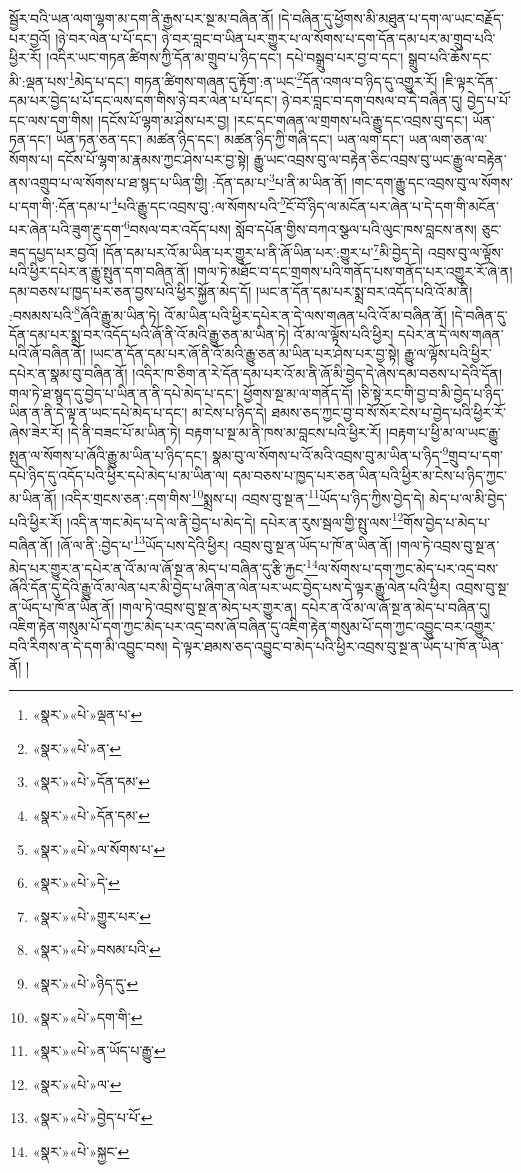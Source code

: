 སྦྱོར་བའི་ཡན་ལག་ལྷག་མ་དག་ནི་རྒྱས་པར་སྔ་མ་བཞིན་ནོ། །དེ་བཞིན་དུ་ཕྱོགས་མི་མཐུན་པ་དག་ལ་ཡང་བརྗོད་པར་བྱའོ། །ཉེ་བར་ལེན་པ་པོ་དང་། ཉེ་བར་བླང་བ་ཡིན་པར་གྱུར་པ་ལ་སོགས་པ་དག་དོན་དམ་པར་མ་གྲུབ་པའི་ཕྱིར་རོ། །འདིར་ཡང་གཏན་ཚིགས་ཀྱི་དོན་མ་གྲུབ་པ་ཉིད་དང་། དཔེ་བསྒྲུབ་པར་བྱ་བ་དང་། སྒྲུབ་པའི་ཆོས་དང་མི་:ལྡན་པས་\footnote{«སྣར་»«པེ་»ལྡན་པ་}མེད་པ་དང་། གཏན་ཚིགས་གཞན་དུ་རྟོག་:ན་ཡང་\footnote{«སྣར་»«པེ་»ན་}དོན་འགལ་བ་ཉིད་དུ་འགྱུར་རོ། །ཇི་ལྟར་དོན་དམ་པར་བྱེད་པ་པོ་དང་ལས་དག་གིས་ཉེ་བར་ལེན་པ་པོ་དང་། ཉེ་བར་བླང་བ་དག་བསལ་བ་དེ་བཞིན་དུ། བྱེད་པ་པོ་དང་ལས་དག་གིས། །དངོས་པོ་ལྷག་མ་ཤེས་པར་བྱ། །རང་དང་གཞན་ལ་གྲགས་པའི་རྒྱུ་དང་འབྲས་བུ་དང་། ཡོན་ཏན་དང་། ཡོན་ཏན་ཅན་དང་། མཚན་ཉིད་དང་། མཚན་ཉིད་ཀྱི་གཞི་དང་། ཡན་ལག་དང་། ཡན་ལག་ཅན་ལ་སོགས་པ། དངོས་པོ་ལྷག་མ་རྣམས་ཀྱང་ཤེས་པར་བྱ་སྟེ། རྒྱུ་ཡང་འབྲས་བུ་ལ་བརྟེན་ཅིང་འབྲས་བུ་ཡང་རྒྱུ་ལ་བརྟེན་ནས་འགྲུབ་པ་ལ་སོགས་པ་ཐ་སྙད་པ་ཡིན་གྱི། :དོན་དམ་པ་\footnote{«སྣར་»«པེ་»དོན་དམ་}པ་ནི་མ་ཡིན་ནོ། །གང་དག་རྒྱུ་དང་འབྲས་བུ་ལ་སོགས་པ་དག་གི་:དོན་དམ་པ་\footnote{«སྣར་»«པེ་»དོན་དམ་}པའི་རྒྱུ་དང་འབྲས་བུ་:ལ་སོགས་པའི་\footnote{«སྣར་»«པེ་»ལ་སོགས་པ་}ངོ་བོ་ཉིད་ལ་མངོན་པར་ཞེན་པ་དེ་དག་གི་མངོན་པར་ཞེན་པའི་ཟུག་རྔུ་དག་\footnote{«སྣར་»«པེ་»དེ་}བསལ་བར་འདོད་པས། སློབ་དཔོན་གྱིས་བཀའ་སྩལ་པའི་ལུང་ཁས་བླངས་ནས། ཅུང་ཟད་དཔྱད་པར་བྱའོ། །དོན་དམ་པར་འོ་མ་ཡིན་པར་གྱུར་པ་ནི་ཞོ་ཡིན་པར་:གྱུར་པ་\footnote{«སྣར་»«པེ་»གྱུར་པར་}མི་བྱེད་དེ། འབྲས་བུ་ལ་ལྟོས་པའི་ཕྱིར་དཔེར་ན་རྒྱུ་སྤུན་དག་བཞིན་ནོ། །གལ་ཏེ་མཐོང་བ་དང་གྲགས་པའི་གནོད་པས་གནོད་པར་འགྱུར་རོ་ཞེ་ན། དམ་བཅས་པ་ཁྱད་པར་ཅན་བྱས་པའི་ཕྱིར་སྐྱོན་མེད་དོ། །ཡང་ན་དོན་དམ་པར་སྨྲ་བར་འདོད་པའི་འོ་མ་ནི། :བསམས་པའི་\footnote{«སྣར་»«པེ་»བསམ་པའི་}ཞོའི་རྒྱུ་མ་ཡིན་ཏེ། འོ་མ་ཡིན་པའི་ཕྱིར་དཔེར་ན་དེ་ལས་གཞན་པའི་འོ་མ་བཞིན་ནོ། །དེ་བཞིན་དུ་དོན་དམ་པར་སྨྲ་བར་འདོད་པའི་ཞོ་ནི་འོ་མའི་རྒྱུ་ཅན་མ་ཡིན་ཏེ། འོ་མ་ལ་ལྟོས་པའི་ཕྱིར། དཔེར་ན་དེ་ལས་གཞན་པའི་ཞོ་བཞིན་ནོ། །ཡང་ན་དོན་དམ་པར་ཞོ་ནི་འོ་མའི་རྒྱུ་ཅན་མ་ཡིན་པར་ཤེས་པར་བྱ་སྟེ། རྒྱུ་ལ་ལྟོས་པའི་ཕྱིར་དཔེར་ན་སྣམ་བུ་བཞིན་ནོ། །འདིར་ཁ་ཅིག་ན་རེ་དོན་དམ་པར་འོ་མ་ནི་ཞོ་མི་བྱེད་དེ་ཞེས་དམ་བཅས་པ་དེའི་དོན། གལ་ཏེ་ཐ་སྙད་དུ་བྱེད་པ་ཡིན་ན་ནི་དཔེ་མེད་པ་དང་། ཕྱོགས་སྔ་མ་ལ་གནོད་དོ། །ཅི་སྟེ་རང་གི་བྱ་བ་མི་བྱེད་པ་ཉིད་ཡིན་ན་ནི་དེ་ལྟ་ན་ཡང་དཔེ་མེད་པ་དང་། མ་ངེས་པ་ཉིད་དེ། ཐམས་ཅད་ཀྱང་བྱ་བ་སོ་སོར་ངེས་པ་བྱེད་པའི་ཕྱིར་རོ་ཞེས་ཟེར་རོ། །དེ་ནི་བཟང་པོ་མ་ཡིན་ཏེ། བརྟག་པ་སྔ་མ་ནི་ཁས་མ་བླངས་པའི་ཕྱིར་རོ། །བརྟག་པ་ཕྱི་མ་ལ་ཡང་རྒྱུ་སྤུན་ལ་སོགས་པ་ཞོའི་རྒྱུ་མ་ཡིན་པ་ཉིད་དང་། སྣམ་བུ་ལ་སོགས་པ་འོ་མའི་འབྲས་བུ་མ་ཡིན་པ་ཉིད་\footnote{«སྣར་»«པེ་»ཉིད་དུ་}གྲུབ་པ་དག་དཔེ་ཉིད་དུ་འདོད་པའི་ཕྱིར་དཔེ་མེད་པ་མ་ཡིན་ལ། དམ་བཅས་པ་ཁྱད་པར་ཅན་ཡིན་པའི་ཕྱིར་མ་ངེས་པ་ཉིད་ཀྱང་མ་ཡིན་ནོ། །འདིར་གྲངས་ཅན་:དག་གིས་\footnote{«སྣར་»«པེ་»དག་གི་}སྨྲས་པ། འབྲས་བུ་སྔ་ན་\footnote{«སྣར་»«པེ་»ན་ཡོད་པ་རྒྱུ་}ཡོད་པ་ཉིད་ཀྱིས་བྱེད་དེ། མེད་པ་ལ་མི་བྱེད་པའི་ཕྱིར་རོ། །འདི་ན་གང་མེད་པ་དེ་ལ་ནི་བྱེད་པ་མེད་དེ། དཔེར་ན་རུས་སྦལ་གྱི་སྤུ་ལས་\footnote{«སྣར་»«པེ་»ལ་}གོས་བྱེད་པ་མེད་པ་བཞིན་ནོ། །ཞོ་ལ་ནི་:བྱེད་པ་\footnote{«སྣར་»«པེ་»བྱེད་པ་པོ་}ཡོད་པས་དེའི་ཕྱིར། འབྲས་བུ་སྔ་ན་ཡོད་པ་ཁོ་ན་ཡིན་ནོ། །གལ་ཏེ་འབྲས་བུ་སྔ་ན་མེད་པར་གྱུར་ན་དཔེར་ན་འོ་མ་ལ་ཞོ་སྔ་ན་མེད་པ་བཞིན་དུ་རྩི་རྐྱང་\footnote{«སྣར་»«པེ་»སྐྱང་}ལ་སོགས་པ་དག་ཀྱང་མེད་པར་འདྲ་བས་ཞོའི་དོན་དུ་དེའི་རྒྱུ་འོ་མ་ལེན་པར་མི་བྱེད་པ་ཞིག་ན་ལེན་པར་ཡང་བྱེད་པས་དེ་ལྟར་རྒྱུ་ལེན་པའི་ཕྱིར། འབྲས་བུ་སྔ་ན་ཡོད་པ་ཁོ་ན་ཡིན་ནོ། །གལ་ཏེ་འབྲས་བུ་སྔ་ན་མེད་པར་གྱུར་ན། དཔེར་ན་འོ་མ་ལ་ཞོ་སྔ་ན་མེད་པ་བཞིན་དུ། འཇིག་རྟེན་གསུམ་པོ་དག་ཀྱང་མེད་པར་འདྲ་བས་ཞོ་བཞིན་དུ་འཇིག་རྟེན་གསུམ་པོ་དག་ཀྱང་འབྱུང་བར་འགྱུར་བའི་རིགས་ན་དེ་དག་མི་འབྱུང་བས། དེ་ལྟར་ཐམས་ཅད་འབྱུང་བ་མེད་པའི་ཕྱིར་འབྲས་བུ་སྔ་ན་ཡོད་པ་ཁོ་ན་ཡིན་ནོ། །
